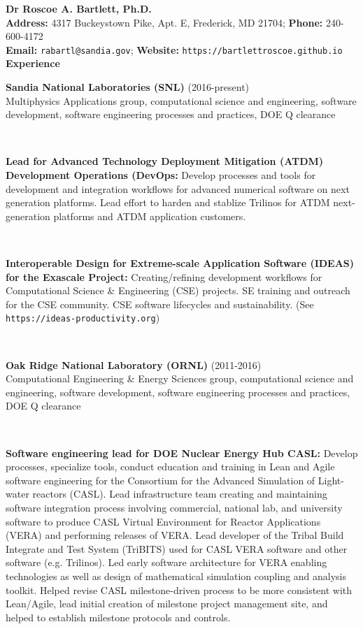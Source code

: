 \documentclass{report}
\newcommand{\itemvs}{1ex}
\newcommand{\sectitlevs}{1.2ex}
\newcommand{\indentone}{0.5in}
\newcommand{\widthone}{6.4in}
\newcommand{\pboxone}{\hspace*{\indentone}\parbox[t]{\widthone}}
\newcommand{\indenttwo}{0.75in}
\newcommand{\widthtwo}{6.15in}
\newcommand{\pboxtwo}{\hspace*{\indenttwo}\parbox[t]{\widthtwo}}
\begin{document}
%
\textbf{\LARGE Dr Roscoe A. Bartlett, Ph.D.} \\
\textbf{Address:} 4317 Buckeystown Pike, Apt. E, Frederick, MD 21704; \textbf{Phone:} 240-600-4172
\\
{}\textbf{Email:} {}\texttt{rabartl@sandia.gov};
{}\textbf{Website:} {}\texttt{https://bartlettroscoe.github.io}
%
%
\framebox[\textwidth]{}\\[2.0ex]
%
%
\textbf{\Large Experience}\\[\sectitlevs]
%
{}\pboxone{\textbf{Sandia National Laboratories (SNL)} (2016-present)\\
Multiphysics Applications group, computational science and engineering, software development, software engineering processes and practices, DOE Q clearance} \\[\itemvs]
%
{}\pboxtwo{\textbf{Lead for Advanced Technology Deployment Mitigation (ATDM) Development Operations (DevOps:}  Develop processes and tools for development and integration workflows for advanced numerical software on next generation platforms.  Lead effort to harden and stablize Trilinos for ATDM next-generation platforms and ATDM application customers.} \\[\itemvs]
%
{}\pboxtwo{\textbf{Interoperable Design for Extreme-scale Application Software (IDEAS) for the Exascale Project:} Creating/refining development workflows for Computational Science \& Engineering (CSE) projects. SE training and outreach for the CSE community. CSE software lifecycles and sustainability.  (See \texttt{https://ideas-productivity.org})}
\\[\itemvs]
%
%
{}\pboxone{\textbf{Oak Ridge National Laboratory (ORNL)} (2011-2016)\\
Computational Engineering \& Energy Sciences group, computational science and engineering, software development, software engineering processes and practices, DOE Q clearance} \\[\itemvs]
%
{}\pboxtwo{\textbf{Software engineering lead for DOE Nuclear Energy Hub CASL:} Develop processes, specialize tools, conduct education and training in Lean and Agile software engineering for the Consortium for the Advanced Simulation of Light-water reactors (CASL).  Lead infrastructure team creating and maintaining software integration process involving commercial, national lab, and university software to produce CASL Virtual Environment for Reactor Applications (VERA) and performing releases of VERA.  Lead developer of the Tribal Build Integrate and Test System (TriBITS) used for CASL VERA software and other software (e.g. Trilinos).  Led early software architecture for VERA enabling technologies as well as design of mathematical simulation coupling and analysis toolkit.  Helped revise CASL milestone-driven process to be more consistent with Lean/Agile, lead initial creation of milestone project management site, and helped to establish milestone protocols and controls.} \\[\itemvs]
\end{document}
